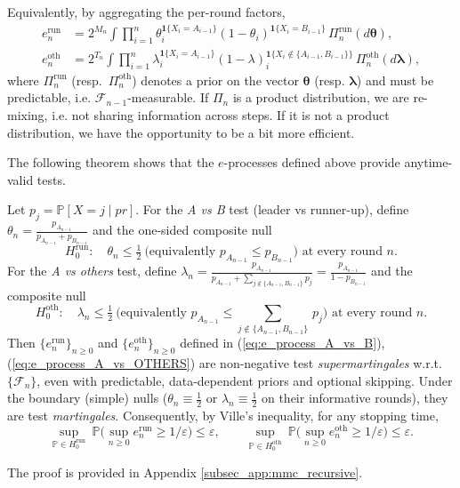 Equivalently, by aggregating the per-round factors,
\begin{align}
e^{\mathrm{run}}_n
&= 2^{M_n}\!\int \prod_{i=1}^n\theta_{i}^{\mathbf{1}\{X_i=A_{i-1}\}}(1-\theta_i)^{\mathbf{1}\{X_i=B_{i-1}\}}\,\Pi^{\mathrm{run}}_n(d\bm\theta),\label{eq:e_process_A_vs_B}\\
e^{\mathrm{oth}}_n
&= 2^{T_n}\!\int \prod_{i=1}^n\lambda_i^{\mathbf{1}\{X_i=A_{i-1}\}}(1-\lambda)_i^{\mathbf{1}\{X_i\notin \{A_{i-1},B_{i-1}\}\}}\,\Pi^{\mathrm{oth}}_n(d\bm\lambda),\label{eq:e_process_A_vs_OTHERS}
\end{align}
where $\Pi^{\mathrm{run}}_n$ (resp.\ $\Pi^{\mathrm{oth}}_n$) denotes a prior on the vector $\bm\theta$ (resp. $\bm\lambda$) and must be predictable, i.e. $\mathcal F_{n-1}$-measurable.
If $\Pi_n$ is a product distribution, we are re-mixing, i.e. not sharing information across steps.   If it is not a product distribution, we have the opportunity to be a bit more efficient.

The following theorem shows that the $e$-processes defined above provide anytime-valid tests.


\begin{theorem}\label{thm:mmc_eprocess_recursive}
Let $p_j=\mathbb P[X=j\mid pr]$. For the \emph{A vs B} test (leader vs runner-up), define
$\theta_n = \tfrac{p_{A_{n-1}}}{p_{A_{n-1}}+p_{B_{n-1}}}$ and the one-sided composite null
\[
H^{\mathrm{run}}_0:\quad \theta_n \le \tfrac12 \ \big(\text{equivalently $p_{A_{n-1}}\le p_{B_{n-1}}$}\big) \,\,\text{at every round $n$.}
\]
For the \emph{A vs others} test, define
$\lambda_n = \tfrac{p_{A_{n-1}}}{p_{A_{n-1}}+\sum_{j\notin\{A_{n-1},B_{n-1}\}}p_j} = \tfrac{p_{A_{n-1}}}{1-p_{B_{n-1}}}$
and the composite null
\[
H^{\mathrm{oth}}_0:\quad \lambda_n \le \tfrac12 \ \big(\text{equivalently $p_{A_{n-1}}\le \scriptstyle{\sum_{j\notin\{A_{n-1},B_{n-1}\}}}$$\, p_j$}\big) \,\,\text{at every round $n$.}
\]
Then $\{e^{\mathrm{run}}_n\}_{n\ge0}$ and $\{e^{\mathrm{oth}}_n\}_{n\ge0}$ defined in (\ref{eq:e_process_A_vs_B}), (\ref{eq:e_process_A_vs_OTHERS}) are non-negative test
\emph{supermartingales} w.r.t.\ $\{\mathcal F_n\}$, even with predictable, data-dependent priors and optional skipping.
Under the boundary (simple) nulls ($\theta_n\equiv\tfrac12$ or $\lambda_n\equiv\tfrac12$ on their informative rounds),
they are test \emph{martingales}. Consequently, by Ville’s inequality, for any stopping time,
\[
\sup_{\mathbb P\in H^{\mathrm{run}}_0}\ \mathbb P\Big(\sup_{n\ge0}e^{\mathrm{run}}_n\ge 1/\varepsilon\Big)\le\varepsilon,
\qquad
\sup_{\mathbb P\in H^{\mathrm{oth}}_0}\ \mathbb P\Big(\sup_{n\ge0}e^{\mathrm{oth}}_n\ge 1/\varepsilon\Big)\le\varepsilon.
\]
\end{theorem}
The proof is provided in Appendix \ref{subsec_app:mmc_recursive}.

